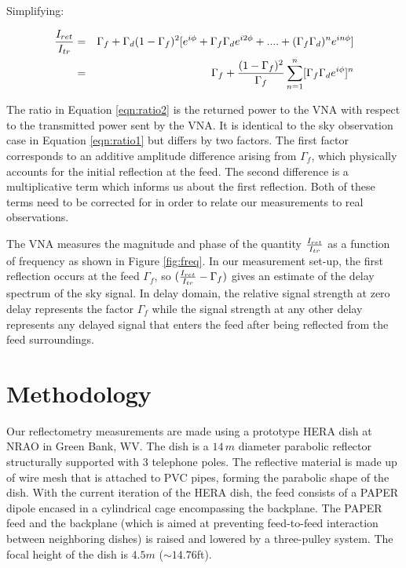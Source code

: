 \documentclass[12pt,preprint]{aastex}
\begin{document}
Simplifying:
 
  \begin{eqnarray}\label{eqn:ratio2}
 {I_{ret} \over I_{tr} } & = & \Gamma_{f}
  +  \Gamma_{d}(1-\Gamma_f)^{2} [e^{i\phi}+ \Gamma_{f}\Gamma_{d} e^{i2\phi}+  ....+ (\Gamma_{f}\Gamma_{d})^{n}e^{i n\phi}]\nonumber\\
  & = & \Gamma_{f} + { (1-\Gamma_f)^{2}\over \Gamma_{f} } \displaystyle\sum\limits_{n=1}^{n} [\Gamma_{f}\Gamma_{d}e^{i\phi}]^{n}
   \nonumber\\
\end{eqnarray}

The ratio in Equation \ref{eqn:ratio2} is the returned power to the VNA with
respect to the transmitted power sent by the VNA. It is identical to the sky
observation case in Equation \ref{eqn:ratio1} but differs by two factors. The
first factor corresponds to an additive amplitude difference arising from
$\Gamma_{f}$, which physically accounts for the initial reflection at the feed.
The second difference is a multiplicative term which informs us about the first
reflection. Both of these terms need to be corrected for in order to relate our
measurements to real observations.

The VNA measures the magnitude and phase of the quantity ${I_{ret}\over I_{tr}}$
as a function of frequency as shown in Figure \ref{fig:freq}. In our measurement
set-up, the first reflection occurs at the feed $\Gamma_{f}$, so
$({I_{ret} \over I_{tr} }  - \Gamma_{f}) $ gives an estimate of the delay
spectrum of the sky signal. In delay domain, the relative signal strength at
zero delay represents the factor $\Gamma_{f}$ while the signal strength at any
other delay represents any delayed signal that enters the feed after being
reflected from the feed surroundings. 

\section{Methodology}{\label{sec:methods}}

Our reflectometry measurements are made using a prototype HERA dish at NRAO in Green Bank, WV. The dish is a $14\,m$ diameter
parabolic reflector structurally supported with 3 telephone poles. The
reflective material is made up of wire mesh that is attached to PVC
pipes, forming the parabolic shape of the dish. With the current iteration of
the HERA dish, the feed consists of a PAPER dipole encased in a cylindrical cage
encompassing the backplane. The PAPER feed and the backplane (which is aimed at
preventing feed-to-feed interaction between neighboring dishes) is raised and
lowered by a three-pulley system. The focal height of the dish is $4.5m$
($\sim{14.76}$ft).  
\end{document}
